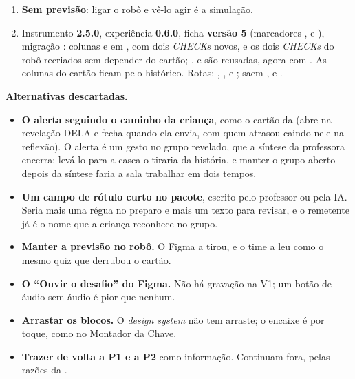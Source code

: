 \begin{enumerate}
    checar; \enquote{em processo} em todo o resto (inclusive a condição que
    pega uma só mensagem). No chute (512 robôs, ligado uma vez e enviado),
    6,25\,\%.
  \item \textbf{Sem previsão}: ligar o robô e vê-lo agir é a simulação.
  \item Instrumento \textbf{2.5.0}, experiência \textbf{0.6.0}, ficha
    \textbf{versão 5} (marcadores ,
     e ), migração
    : colunas
     e  em , com dois
    \emph{CHECKs} novos, e os dois \emph{CHECKs} do robô recriados sem
    depender do cartão; ,  e
     são reusadas, agora com . As colunas do cartão
    ficam pelo histórico. Rotas: ,
    ,
     e
    ; saem ,
     e .
\end{enumerate}

\textbf{Alternativas descartadas.}

\begin{itemize}
  \item \textbf{O alerta seguindo o caminho da criança}, como o cartão da
     (abre na revelação DELA e fecha quando ela envia, com quem
    atrasou caindo nele na reflexão). O alerta é um gesto no grupo revelado,
    que a síntese da professora encerra; levá-lo para a casca o tiraria da
    história, e manter o grupo aberto depois da síntese faria a sala
    trabalhar em dois tempos.
  \item \textbf{Um campo de rótulo curto no pacote}, escrito pelo professor ou
    pela IA. Seria mais uma régua no preparo e mais um texto para revisar,
    e o remetente já é o nome que a criança reconhece no grupo.
  \item \textbf{Manter a previsão no robô.} O Figma a tirou, e o time a leu
    como o mesmo quiz que derrubou o cartão.
  \item \textbf{O \enquote{Ouvir o desafio} do Figma.} Não há gravação na V1;
    um botão de áudio sem áudio é pior que nenhum.
  \item \textbf{Arrastar os blocos.} O \emph{design system} não tem arraste;
    o encaixe é por toque, como no Montador da Chave.
  \item \textbf{Trazer de volta a P1 e a P2} como informação. Continuam fora,
    pelas razões da .
\end{itemize}

